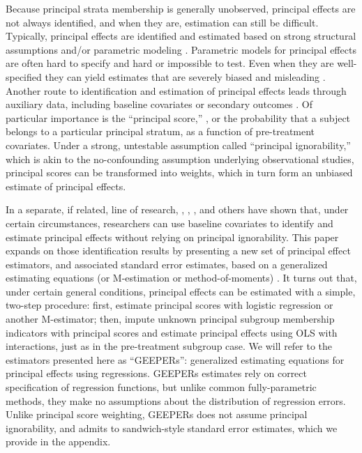 \documentclass[11pt]{article} %
\begin{document}
Because principal strata membership is generally unobserved, principal effects are not always identified, and when they are, estimation can still be difficult.
Typically, principal effects are identified and estimated based on strong structural assumptions \citep[e.g.][]{air} and/or parametric modeling \citep[e.g.][]{imbens1997bayesian}.
Parametric models for principal effects are often hard to specify and hard or impossible to test.
Even when they are well-specified they can yield estimates that are severely biased and misleading \citep{griffin2008application,feller2016principal}.
Another route to identification and estimation of principal effects leads through auxiliary data, including baseline covariates or secondary outcomes \citep{mattei2013exploiting}.
Of particular importance is the ``principal score,'' \citep{jo,ding2017principal,feller2017principal}, or the probability that a subject belongs to a particular principal stratum, as a function of pre-treatment covariates.
Under a strong, untestable assumption called ``principal ignorability,'' which is akin to the no-confounding assumption underlying observational studies, principal scores can be transformed into weights, which in turn form an unbiased estimate of principal effects.

In a separate, if related, line of research, \citet{jo2002}, \citet{ding2011}, \citet{jiangDing2021}, and others have shown that, under certain circumstances, researchers can use baseline covariates to identify and estimate principal effects without relying on principal ignorability.
This paper expands on those identification results by presenting a new set of principal effect estimators, and associated standard error estimates, based on a generalized estimating equations (or M-estimation or method-of-moments) \citep{stefanskiBoos}.
It turns out that, under certain general conditions, principal effects can be estimated with a simple, two-step procedure: first, estimate principal scores with logistic regression or another M-estimator; then, impute unknown principal subgroup membership indicators with principal scores and estimate principal effects using OLS with interactions, just as in the pre-treatment subgroup case.
We will refer to the estimators presented here as ``GEEPERs'': generalized estimating equations for principal effects using regressions.
GEEPERs estimates rely on correct specification of regression functions, but unlike common fully-parametric methods, they make no assumptions about the distribution of regression errors.
Unlike principal score weighting, GEEPERs does not assume principal ignorability, and admits to sandwich-style standard error estimates, which we provide in the appendix.
\end{document}
